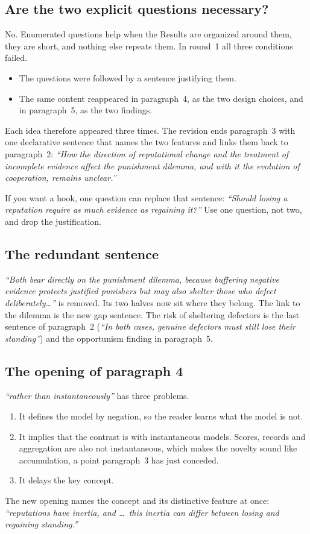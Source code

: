 \documentclass[11pt]{article}
\newcommand{\old}[1]{\textit{``#1''}}
\begin{document}
\subsection*{Are the two explicit questions necessary?}
No. Enumerated questions help when the Results are organized around them, they are short, and nothing else repeats them. In round~1 all three conditions failed.
\begin{itemize}[leftmargin=1.2em]
\item The questions were followed by a sentence justifying them.
\item The same content reappeared in paragraph~4, as the two design choices, and in paragraph~5, as the two findings.
\end{itemize}
Each idea therefore appeared three times. The revision ends paragraph~3 with one declarative sentence that names the two features and links them back to paragraph~2: \emph{``How the direction of reputational change and the treatment of incomplete evidence affect the punishment dilemma, and with it the evolution of cooperation, remains unclear.''}

If you want a hook, one question can replace that sentence: \emph{``Should losing a reputation require as much evidence as regaining it?''} Use one question, not two, and drop the justification.

\subsection*{The redundant sentence}
\old{Both bear directly on the punishment dilemma, because buffering negative evidence protects justified punishers but may also shelter those who defect deliberately\dots} is removed. Its two halves now sit where they belong. The link to the dilemma is the new gap sentence. The risk of sheltering defectors is the last sentence of paragraph~2 (\emph{``In both cases, genuine defectors must still lose their standing''}) and the opportunism finding in paragraph~5.

\subsection*{The opening of paragraph 4}
\old{rather than instantaneously} has three problems.
\begin{enumerate}[leftmargin=1.5em]
\item It defines the model by negation, so the reader learns what the model is not.
\item It implies that the contrast is with instantaneous models. Scores, records and aggregation are also not instantaneous, which makes the novelty sound like accumulation, a point paragraph~3 has just conceded.
\item It delays the key concept.
\end{enumerate}
The new opening names the concept and its distinctive feature at once: \emph{``reputations have inertia, and \dots\ this inertia can differ between losing and regaining standing.''}
\end{document}

